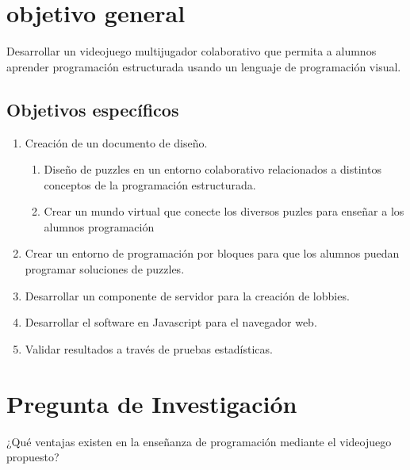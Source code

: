 \section{objetivo general}
Desarrollar un videojuego multijugador colaborativo que permita a alumnos aprender programación estructurada usando un lenguaje de programación visual. 

\subsection{Objetivos específicos}

\begin{enumerate}
    \item Creación de un documento de diseño.
    \begin{enumerate}
        \item Diseño de puzzles en un entorno colaborativo relacionados a distintos conceptos de la programación estructurada. 
        \item 	Crear un mundo virtual que conecte los diversos puzles para enseñar a los alumnos programación 
    \end{enumerate}
    \item Crear un entorno de programación por bloques para que los alumnos puedan programar soluciones de puzzles.
    \item Desarrollar un componente de servidor para la creación de lobbies.
    \item Desarrollar el software en Javascript para el navegador web.
    \item Validar resultados a través de pruebas estadísticas.
\end{enumerate}

\section{Pregunta de Investigación}
¿Qué ventajas existen en la enseñanza de programación mediante el videojuego propuesto?

